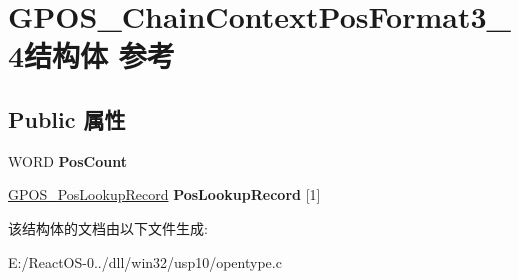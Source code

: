 \hypertarget{struct_g_p_o_s___chain_context_pos_format3__4}{}\section{G\+P\+O\+S\+\_\+\+Chain\+Context\+Pos\+Format3\+\_\+4结构体 参考}
\label{struct_g_p_o_s___chain_context_pos_format3__4}
\subsection*{Public 属性}
\begin{DoxyCompactItemize}
\item 
\mbox{\label{struct_g_p_o_s___chain_context_pos_format3__4_a64072d1833c0b68f26e67c4dc9a73a74}} 
W\+O\+RD {\bfseries Pos\+Count}
\item 
\mbox{\label{struct_g_p_o_s___chain_context_pos_format3__4_af5ae0d2315732ec453daae33437d2213}} 
\hyperlink{struct_g_p_o_s___pos_lookup_record}{G\+P\+O\+S\+\_\+\+Pos\+Lookup\+Record} {\bfseries Pos\+Lookup\+Record} \mbox{[}1\mbox{]}
\end{DoxyCompactItemize}


该结构体的文档由以下文件生成\+:\begin{DoxyCompactItemize}
\item 
E\+:/\+React\+O\+S-\/0../dll/win32/usp10/opentype.\+c\end{DoxyCompactItemize}
